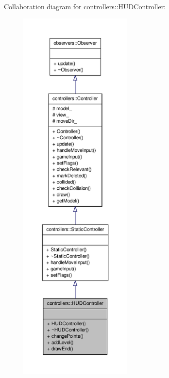 \-Collaboration diagram for controllers\-:\-:\-H\-U\-D\-Controller\-:\nopagebreak
\begin{figure}[H]
\begin{center}
\leavevmode
\includegraphics[height=550pt]{d7/d39/classcontrollers_1_1HUDController__coll__graph}
\end{center}
\end{figure}
